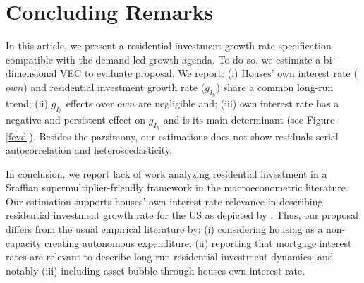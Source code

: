 \section{Concluding Remarks}\label{sec:Conclusion}

In this article, we present a residential investment growth rate specification compatible with the demand-led growth agenda.
To do so, we estimate a bi-dimensional VEC to evaluate \textcite{teixeira_crescimento_2015}
proposal. 
We report: 
	(i) Houses' own interest rate ($own$) and residential investment growth rate ($g_{I_h}$) share a common long-run trend;
	(ii) $g_{I_h}$ effects over $own$ are negligible and; 
	(iii) own interest rate has a negative and persistent effect on $g_{I_h}$ and is its main determinant (see Figure \ref{fevd}).
Besides the parsimony, our estimations does not show residuals serial autocorrelation and heteroscedasticity. 


In conclusion,  we report lack of work analyzing residential investment in a Sraffian supermultiplier-friendly framework in the macroeconometric literature.
Our estimation supports houses' own interest rate relevance in describing residential investment growth rate for the US as depicted by \textcite{teixeira_crescimento_2015}.
Thus, our  proposal differs from the usual empirical literature by:
	(i) considering housing as a non-capacity creating autonomous expenditure;
	(ii) reporting that mortgage interest rates are relevant to describe long-run residential investment dynamics; and notably 
	(iii) including asset bubble through houses own interest rate.

